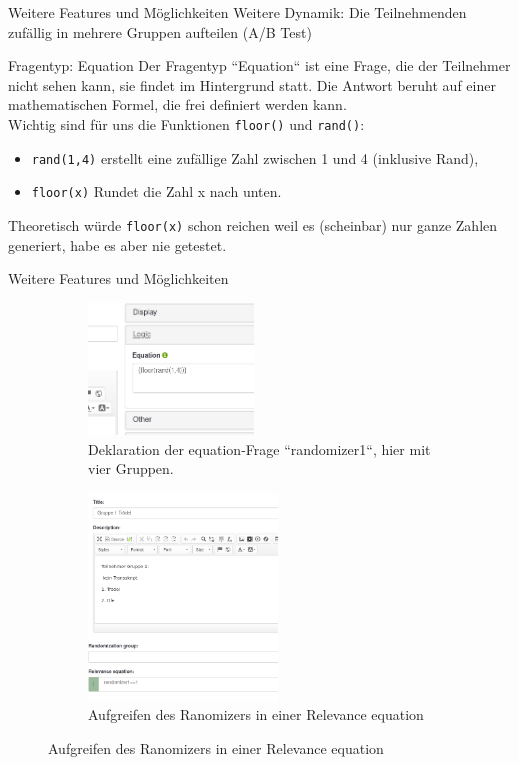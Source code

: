 \documentclass[aspectratio=1610, 9pt]{beamer}
\begin{document}
\begin{frame}
	{Weitere Features und Möglichkeiten}
	Weitere Dynamik: Die Teilnehmenden zufällig in mehrere Gruppen aufteilen
	(\alert{A/B Test})
	\\ \medskip
	\begin{block}{Fragentyp: Equation}
		Der Fragentyp ``Equation`` ist eine Frage, die der \alert{Teilnehmer nicht 
		sehen kann}, sie findet im Hintergrund statt. Die Antwort beruht auf einer
		mathematischen Formel, die frei definiert werden kann.
		\\
		Wichtig sind für uns die Funktionen \texttt{floor()} und \texttt{rand()}:
		\begin{itemize}
			\item \texttt{rand(1,4)} erstellt eine zufällige Zahl zwischen 1
				und 4 (inklusive Rand),
			\item \texttt{floor(x)} Rundet die Zahl x nach unten.
		\end{itemize}
		Theoretisch würde \texttt{floor(x)} schon reichen weil es
		(\alert{scheinbar}) nur ganze Zahlen generiert, habe es aber nie getestet.
	\end{block}
\end{frame}

\begin{frame}
	{Weitere Features und Möglichkeiten}
	\begin{figure}
		\centering
		\begin{subfigure}[b]{0.2\textwidth}
			\centering
			\includegraphics[height=3.5cm]{images/randomizer-equation.png}
			\caption{Deklaration der equation-Frage ``randomizer1``, hier mit
			vier Gruppen.}
		\end{subfigure}
		\begin{subfigure}[b]{0.7\textwidth}
			\centering
			\includegraphics[height=5.5cm]{images/groupe-relevance.png}
			\caption{Aufgreifen des Ranomizers in einer Relevance equation}
		\end{subfigure}
	\end{figure}
\end{frame}
\end{document}
